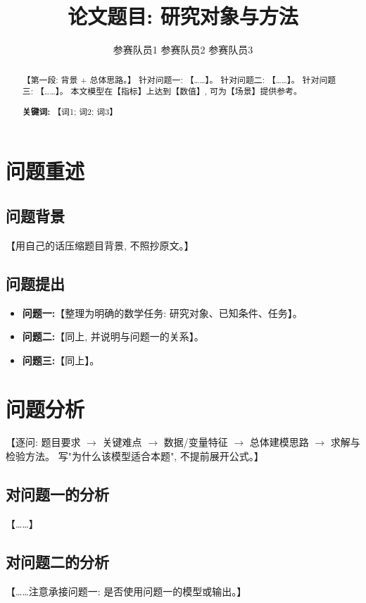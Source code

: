\documentclass[11pt]{ctexart}
\title{\textbf{论文题目: 研究对象与方法}}
\author{参赛队员1 \quad 参赛队员2 \quad 参赛队员3}
\date{}
\begin{document}
\maketitle

\begin{abstract}
【第一段: 背景 + 总体思路。】
针对问题一: 【……】。
针对问题二: 【……】。
针对问题三: 【……】。
本文模型在【指标】上达到【数值】, 可为【场景】提供参考。

\noindent\textbf{关键词:} 【词1; 词2; 词3】
\end{abstract}

\section{问题重述}
\subsection{问题背景}
【用自己的话压缩题目背景, 不照抄原文。】

\subsection{问题提出}
\begin{itemize}
  \item \textbf{问题一:}【整理为明确的数学任务: 研究对象、已知条件、任务】。
  \item \textbf{问题二:}【同上, 并说明与问题一的关系】。
  \item \textbf{问题三:}【同上】。
\end{itemize}

\section{问题分析}
【逐问: 题目要求 $\rightarrow$ 关键难点 $\rightarrow$ 数据/变量特征
$\rightarrow$ 总体建模思路 $\rightarrow$ 求解与检验方法。
写"为什么该模型适合本题", 不提前展开公式。】
\subsection{对问题一的分析}
【……】
\subsection{对问题二的分析}
【……注意承接问题一: 是否使用问题一的模型或输出。】
\end{document}
